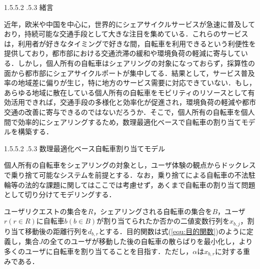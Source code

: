 \documentclass[a4j, 10pt, twocolumn]{ltjarticle}  %
\makeatletter
\renewcommand{\section}{\@startsection{section}{1}{\z@}
   {1.5\Cvs \@plus.5\Cvs \@minus.2\Cvs}
   {.5\Cvs \@plus.3\Cvs}
   {\reset@font\large\bfseries}}  %
\makeatother
\begin{document}
    \renewcommand{\thepage}{\arabic{page}}
    \setcounter{page}{1}
    \twocolumn[
        \vspace*{-30pt}  %
        \vspace*{15pt}  %
    ]


    \section{緒言}
        \label{sec:緒言}
        \vspace{-3mm}
        \par 近年，欧米や中国を中心に，世界的にシェアサイクルサービスが急速に普及しており，持続可能な交通手段として大きな注目を集めている\cite{近況}．これらのサービスは，利用者が好きなタイミングで好きな間，自転車を利用できるという利便性を提供しており，都市部における交通渋滞の緩和や環境負荷の軽減に寄与している．しかし，個人所有の自転車はシェアリングの対象になっておらず，採算性の面から都市部にシェアサイクルポートが集中してる．結果として，サービス普及率の地域差に偏りが生じ，特に地方のサービス需要に対応できていない．もし，あらゆる地域に散在している個人所有の自転車をモビリティのリソースとして有効活用できれば，交通手段の多様化と効率化が促進され，環境負荷の軽減や都市交通の改善に寄与できるのではないだろうか．そこで，個人所有の自転車を個人間で効率的にシェアリングするため，数理最適化ベースで自転車の割り当てモデルを構築する．

    \vspace{-5mm}

    \section{数理最適化ベース自転車割り当てモデル}
        \label{数理最適化ベースの自転車割り当てモデル}
        \vspace{-3mm}
        \par 個人所有の自転車をシェアリングの対象とし，ユーザ体験の観点からドックレスで乗り捨て可能なシステムを前提とする．なお，乗り捨てによる自転車の不法駐輪等の法的な課題に関してはここでは考慮せず，あくまで自転車の割り当て問題として切り分けてモデリングする．
        \par ユーザリクエストの集合を$R$，シェアリングされる自転車の集合を$B$，ユーザ$r(r \in R)$に自転車$b(b \in B)$が割り当てられたか否かの二値変数行列を$x_{b,j}$，割り当て移動後の距離行列を$d_{b,r}$とする．目的関数は式(\ref{equ:目的関数})のように定義し，集合$J$の全てのユーザが移動した後の自転車の散らばりを最小化し，より多くのユーザに自転車を割り当てることを目指す．ただし，$\alpha$は$x_{b,r}$に対する重みである．
\end{document}
